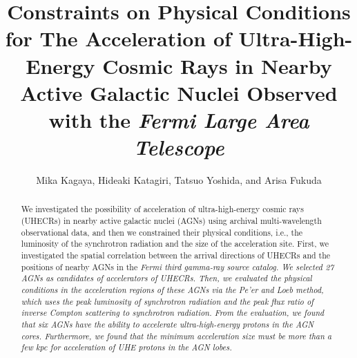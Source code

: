 \documentclass{aastex6}
\begin{document}

\title{Constraints on Physical Conditions for The Acceleration of Ultra-High-Energy Cosmic Rays in Nearby Active Galactic Nuclei Observed with the \it{Fermi}\rm{} Large Area Telescope}


\author{Mika Kagaya, Hideaki Katagiri, Tatsuo Yoshida, and Arisa Fukuda}


\begin{abstract}

We investigated the possibility of acceleration of ultra-high-energy cosmic rays (UHECRs) in nearby active galactic nuclei (AGNs) using archival multi-wavelength observational data, and then we constrained their physical conditions, i.e., the luminosity of the synchrotron radiation and the size of the acceleration site.
First, we investigated the spatial correlation between the arrival directions of UHECRs and the positions of nearby AGNs in the \it{Fermi}\rm{} third gamma-ray source catalog.
We selected 27 AGNs as candidates of accelerators of UHECRs.
Then, we evaluated the physical conditions in the acceleration regions of these AGNs via the Pe'er and Loeb method, which uses the peak luminosity of synchrotron radiation and the peak flux ratio of inverse Compton scattering to synchrotron radiation.
From the evaluation, we found that six AGNs have the ability to accelerate ultra-high-energy \it{protons}\rm{} in the AGN cores.
Furthermore, we found that the minimum acceleration size must be more than a few kpc for acceleration of UHE \it{protons}\rm{} in the AGN lobes.

\end{abstract}
\end{document}
